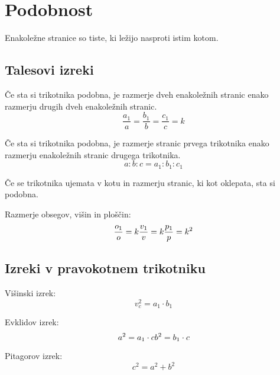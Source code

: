 \documentclass[a4paper,oneside,12pt,fleqn]{article}
\newcommand\krat\cdot
\numberwithin{equation}{section}
\begin{document}
\section{Podobnost}
\label{sec:podob}
Enakoležne stranice so tiste, ki ležijo nasproti istim kotom.

\subsection{Talesovi izreki}
\label{sec:podob:tales}
Če sta si trikotnika podobna, je razmerje dveh enakoležnih stranic enako razmerju drugih
dveh enakoležnih stranic.
\begin{equation}
  \frac{a_1}{a} = \frac{b_1}{b} = \frac{c_1}{c} = k 
  \label{eq:podob:tal1}
\end{equation}

Če sta si trikotnika podobna, je razmerje stranic prvega trikotnika enako razmerju
enakoležnih stranic drugega trikotnika.
\begin{equation}
  a : b : c = a_1 : b_1 : c_1
  \label{eq:podob:tal2}
\end{equation}

Če se trikotnika ujemata v kotu in razmerju stranic, ki kot oklepata, sta si podobna.

Razmerje obsegov, višin in ploščin:
\[ \frac{o_1}{o} = k  \\
 \frac{v_1}{v} = k  \\
 \frac{p_1}{p} = k^2 \]

\subsection{Izreki v pravokotnem trikotniku}
\label{sec:podob:prav}

Višinski izrek:
\begin{equation}
  v_c^2 = a_1 \krat b_1
  \label{eq:podob:trik:vis}
\end{equation}

Evklidov izrek:
\begin{equation}
  a^2 = a_1 \krat c \\
  b^2 = b_1 \krat c
  \label{eq:podob:trik:evk}
\end{equation}

Pitagorov izrek:
\begin{equation}
  c^2 = a^2 + b^2
  \label{eq:podob:trik:pit}
\end{equation}
\end{document}
